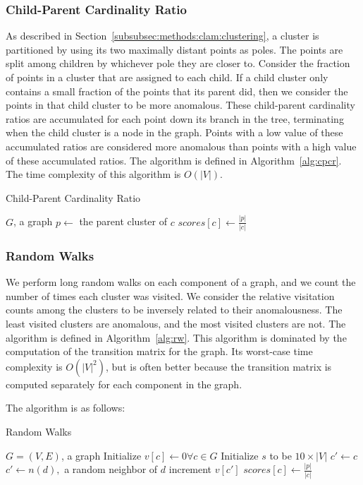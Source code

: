 \subsubsection{Child-Parent Cardinality Ratio}
As described in Section~\ref{subsubsec:methods:clam:clustering}, a cluster is partitioned by using its two maximally distant points as poles.
The points are split among children by whichever pole they are closer to.
Consider the fraction of points in a cluster that are assigned to each child.
If a child cluster only contains a small fraction of the points that its parent did, then we consider the points in that child cluster to be more anomalous.
These child-parent cardinality ratios are accumulated for each point down its branch in the tree, terminating when the child cluster is a node in the graph.
Points with a low value of these accumulated ratios are considered more anomalous than points with a high value of these accumulated ratios. The algorithm is defined in Algorithm~\ref{alg:cpcr}. The time complexity of this algorithm is $O(|V|)$.

\begin{algorithm}[h]
    \caption{Child-Parent Cardinality Ratio}
    \label{alg:cpcr}
\begin{algorithmic}[1]
    \Require $G$, a graph
        \State $p \gets$ the parent cluster of $c$
        \State $scores[c] \gets \frac{|p|}{|c|}$
    \EndFor
\end{algorithmic}
\end{algorithm}


\subsubsection{Random Walks}
We perform long random walks on each component of a graph, and we count the number of times each cluster was visited.
We consider the relative visitation counts among the clusters to be inversely related to their anomalousness.
The least visited clusters are anomalous, and the most visited clusters are not. The algorithm is defined in Algorithm~\ref{alg:rw}.
This algorithm is dominated by the computation of the transition matrix for the graph.
Its worst-case time complexity is $O(|V|^2)$, but is often better because the transition matrix is computed separately for each component in the graph.

The algorithm is as follows:

\begin{algorithm}[h]
    \caption{Random Walks}
    \label{alg:rw}
\begin{algorithmic}[1]
    \Require $G = (V,E)$, a graph
    \State Initialize $v[c] \gets 0 \forall c \in G$
    \State Initialize $s$ to be $10 \times |V|$
        \State $c' \gets c$
            \State $c' \gets n(d),$ a random neighbor of $d$
            \State increment $v[c']$
        \EndFor
    \EndFor
        \State $scores[c] \gets \frac{|p|}{|c|}$
    \EndFor
\end{algorithmic}
\end{algorithm}


